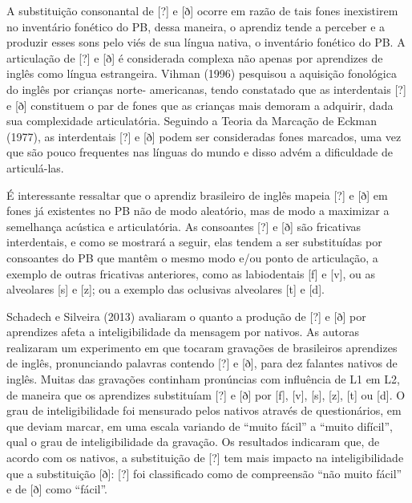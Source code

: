 A substitui\c{c}\~ao consonantal de {[}?{]} e {[}ð{]} ocorre em raz\~ao de tais
fones inexistirem no invent\'ario fon\'etico do PB, dessa maneira, o
aprendiz tende a perceber e a produzir esses sons pelo vi\'es de sua
l\'ingua nativa, o invent\'ario fon\'etico do PB. A articula\c{c}\~ao de {[}?{]} e
{[}ð{]} \'e considerada complexa n\~ao apenas por aprendizes de ingl\^es como
l\'ingua estrangeira. Vihman (1996) pesquisou a aquisi\c{c}\~ao fonol\'ogica do
ingl\^es por crian\c{c}as norte- americanas, tendo constatado que as
interdentais {[}?{]} e {[}ð{]} constituem o par de fones que as crian\c{c}as
mais demoram a adquirir, dada sua complexidade articulat\'oria. Seguindo a
Teoria da Marca\c{c}\~ao de Eckman (1977), as interdentais {[}?{]} e {[}ð{]}
podem ser consideradas fones marcados, uma vez que s\~ao pouco frequentes
nas l\'inguas do mundo e disso adv\'em a dificuldade de articul\'a-las.

\'E interessante ressaltar que o aprendiz brasileiro de ingl\^es mapeia
{[}?{]} e {[}ð{]} em fones j\'a existentes no PB n\~ao de modo aleat\'orio,
mas de modo a maximizar a semelhan\c{c}a ac\'ustica e articulat\'oria. As
consoantes {[}?{]} e {[}ð{]} s\~ao fricativas interdentais, e como se
mostrar\'a a seguir, elas tendem a ser substitu\'idas por consoantes do PB
que mant\^em o mesmo modo e/ou ponto de articula\c{c}\~ao, a exemplo de outras
fricativas anteriores, como as labiodentais {[}f{]} e {[}v{]}, ou as
alveolares {[}s{]} e {[}z{]}; ou a exemplo das oclusivas alveolares
{[}t{]} e {[}d{]}.

Schadech e Silveira (2013) avaliaram o quanto a produ\c{c}\~ao de {[}?{]} e
{[}ð{]} por aprendizes afeta a inteligibilidade da mensagem por nativos.
As autoras realizaram um experimento em que tocaram grava\c{c}\~oes de
brasileiros aprendizes de ingl\^es, pronunciando palavras contendo {[}?{]}
e {[}ð{]}, para dez falantes nativos de ingl\^es. Muitas das grava\c{c}\~oes
continham pron\'uncias com influ\^encia de L1 em L2, de maneira que os
aprendizes substitu\'iam {[}?{]} e {[}ð{]} por {[}f{]}, {[}v{]}, {[}s{]},
{[}z{]}, {[}t{]} ou {[}d{]}. O grau de inteligibilidade foi mensurado
pelos nativos atrav\'es de question\'arios, em que deviam marcar, em uma
escala variando de ``muito f\'acil'' a ``muito dif\'icil'', qual o grau de
inteligibilidade da grava\c{c}\~ao. Os resultados indicaram que, de acordo com
os nativos, a substitui\c{c}\~ao de {[}?{]} tem mais impacto na
inteligibilidade que a substitui\c{c}\~ao {[}ð{]}: {[}?{]} foi classificado
como de compreens\~ao ``n\~ao muito f\'acil'' e de {[}ð{]} como ``f\'acil''.

